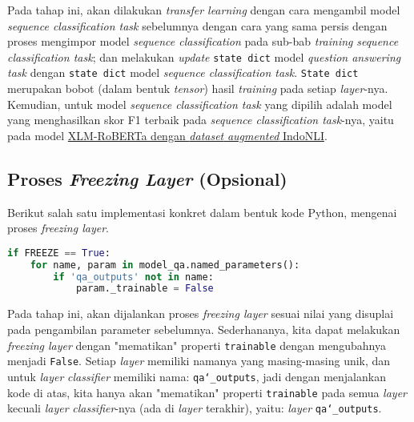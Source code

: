 Pada tahap ini, akan dilakukan \emph{transfer learning} dengan cara mengambil model \emph{sequence classification task} sebelumnya dengan cara yang sama persis dengan proses mengimpor model \emph{sequence classification} pada sub-bab \emph{training} \emph{sequence classification task}; dan melakukan \emph{update} \texttt{state dict} model \emph{question answering task} dengan \texttt{state dict} model \emph{sequence classification task}. \texttt{State dict} merupakan bobot (dalam bentuk \emph{tensor}) hasil \emph{training} pada setiap \emph{layer}-nya. Kemudian, untuk model \emph{sequence classification task} yang dipilih adalah model yang menghasilkan skor F1 terbaik pada \emph{sequence classification task}-nya, yaitu pada model \href{https://huggingface.co/muhammadravi251001/fine-tuned-IndoNLI-Augmented-with-xlm-roberta-large-LR-1e-05}{XLM-RoBERTa dengan \emph{dataset} \emph{augmented} IndoNLI}.

\subsection{Proses \emph{Freezing Layer} (Opsional)}
\label{4.3.7}
Berikut salah satu implementasi konkret dalam bentuk kode Python, mengenai proses \emph{freezing layer}.

\begin{lstlisting}[language=Python, caption=Proses \emph{freezing layer} (opsional)]
if FREEZE == True:
    for name, param in model_qa.named_parameters():
        if 'qa_outputs' not in name:
            param._trainable = False
\end{lstlisting}

Pada tahap ini, akan dijalankan proses \emph{freezing layer} sesuai nilai yang disuplai pada pengambilan parameter sebelumnya. Sederhananya, kita dapat melakukan \emph{freezing layer} dengan "mematikan" properti \texttt{trainable} dengan mengubahnya menjadi \texttt{False}. Setiap \emph{layer} memiliki namanya yang masing-masing unik, dan untuk \emph{layer} \emph{classifier} memiliki nama: \texttt{qa\char`_outputs}, jadi dengan menjalankan kode di atas, kita hanya akan "mematikan" properti \texttt{trainable} pada semua \emph{layer} kecuali \emph{layer} \emph{classifier}-nya (ada di \emph{layer} terakhir), yaitu: \emph{layer} \texttt{qa\char`_outputs}.

